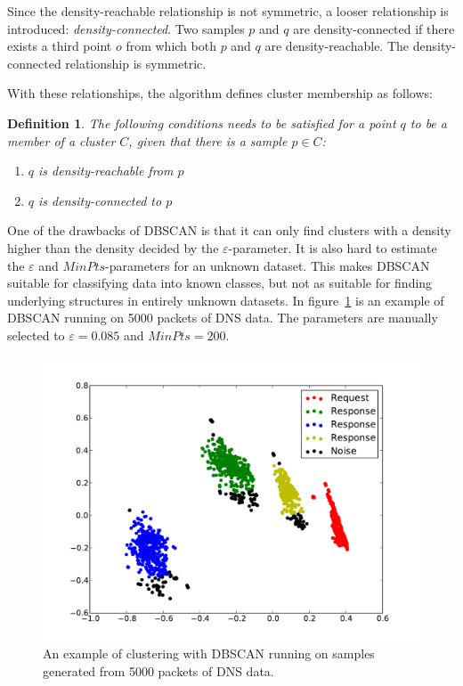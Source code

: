 \documentclass[a4paper]{report}
\newtheorem*{definition}{Definition}
\begin{document}
Since the density-reachable relationship is not symmetric, a looser
relationship is introduced: \emph{density-connected}. Two samples $p$ and
$q$ are density-connected if there exists a third point $o$ from which both
$p$ and $q$ are density-reachable. The density-connected relationship
is symmetric.

With these relationships, the algorithm defines cluster membership as
follows:

\begin{definition}
    The following conditions needs to be satisfied for a point $q$ to be a 
    member of a cluster $C$, given that there is a sample $p \in C$:
    \begin{enumerate}
        \item $q$ is density-reachable from $p$
        \item $q$ is density-connected to $p$
    \end{enumerate}
\end{definition}

One of the drawbacks of DBSCAN is that it can only find clusters with a density
higher than the density decided by the $\varepsilon$-parameter. It is also hard
to estimate the $\varepsilon$ and $MinPts$-parameters for an unknown dataset.
This makes DBSCAN suitable for classifying data into known classes, but not as
suitable for finding underlying structures in entirely unknown datasets. In
figure~\ref{fig:dbscan} is an example of DBSCAN running on 5000 packets of DNS
data. The parameters are manually selected to $\varepsilon = 0.085$ and
$MinPts = 200$.

\begin{figure}[H]
    \includegraphics[width=\linewidth]{dbscan_dns}
    \caption{An example of clustering with DBSCAN running on samples generated
    from 5000 packets of DNS data.}
    \label{fig:dbscan}
\end{figure}
\end{document}
